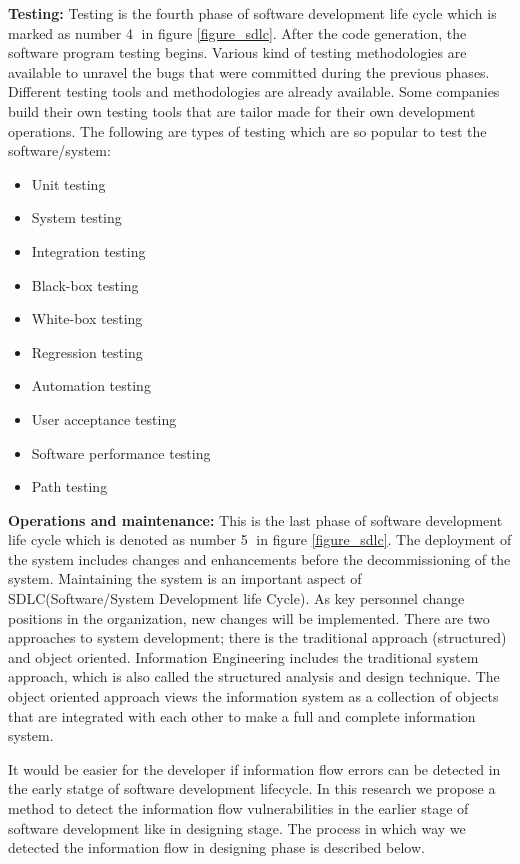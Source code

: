\textbf{Testing:}
Testing is the fourth phase of software development life cycle which is marked as number \textcircled{4} in figure \ref{figure_sdlc}. After the code generation, the software program testing begins. Various kind of testing methodologies are available to unravel the bugs that were committed during the previous phases. Different testing tools and methodologies are already available. Some companies build their own testing tools that are tailor made for their own development operations. The following are types of testing which are so popular to test the software/system:
\begin{itemize}
	\item Unit testing
    \item System testing
	\item Integration testing
	\item Black-box testing
	\item White-box testing
	\item Regression testing
	\item Automation testing
	\item User acceptance testing
	\item Software performance testing
	\item Path testing
\end{itemize}

\textbf{Operations and maintenance:}
This is the last phase of software development life cycle which is denoted as number \textcircled{5} in figure \ref{figure_sdlc}. The deployment of the system includes changes and enhancements before the decommissioning of the system. Maintaining the system is an important aspect of SDLC(Software/System Development life Cycle). As key personnel change positions in the organization, new changes will be implemented. There are two approaches to system development; there is the traditional approach (structured) and object oriented. Information Engineering includes the traditional system approach, which is also called the structured analysis and design technique. The object oriented approach views the information system as a collection of objects that are integrated with each other to make a full and complete information system.

It would be easier for the developer if information flow errors can be detected in the early statge of software development lifecycle. In this research we propose a method to detect the information flow vulnerabilities in the earlier stage of software development like in designing stage. The process in which way we detected the information flow in designing phase is described below.

